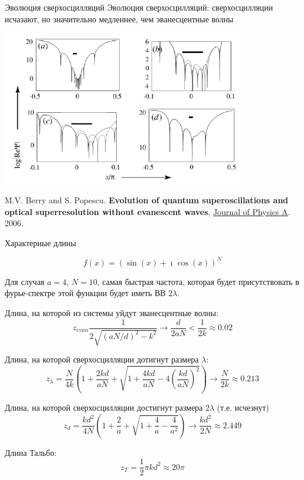 \documentclass[9pt, compress, xcolor=table]{beamer}
\begin{document}
\begin{frame}{Эволюция сверхосцилляций}
Эволюция сверхосцилляций: сверхосцилляции исчазают, но значительно медленнее, чем эванесцентные волны

\begin{center}
\includegraphics[width=0.8\textwidth]{nh7}
\end{center}

M.V. Berry and S. Popescu. \textbf{Evolution of quantum superoscillations and optical superresolution without evanescent waves}, \underline{Journal of Physics A}. 2006.
\end{frame}

\begin{frame}{Характерные длины}

\begin{equation*}
f(x)=\left(\sin(x)+\imath \cos(x)\right)^N
\end{equation*}

{\small Для случая $a=4$, $N=10$, самая быстрая частота, которая будет присутствовать в фурье-спектре этой функции будет иметь ВВ $2\lambda$.}

Длина, на которой из системы уйдут эванесцентные волны:
\begin{equation*}
z_{evan}\frac{1}{2\sqrt{(aN/d)^2-k^2}}\rightarrow\frac{d}{2aN}<\frac{1}{2k}\approx 0.02
\end{equation*}

Длина, на которой сверхосцилляции дотигнут размера $\lambda$:
\begin{equation*}
z_{\lambda}=\frac{N}{4k}\left(1+\frac{2kd}{aN}+\sqrt{1+\frac{4kd}{aN}-4\left(\frac{kd}{aN}\right)^2}\right)\rightarrow\frac{N}{2k}\approx 0.213
\end{equation*}

Длина, на которой сверхосцилляции достигнут размера $2\lambda$ (т.е. исчезнут)
\begin{equation*}
z_{d}=\frac{kd^2}{4N}\left(1+\frac{2}{a}+\sqrt{1+\frac{4}{a}-\frac{4}{a^2}}\right)\rightarrow\frac{kd^2}{2N}\approx 2.449
\end{equation*}

Длина Тальбо:
\begin{equation*}
z_{T}=\frac{1}{2}\pi k d^2\approx 20 \pi
\end{equation*}

\end{frame}
\end{document}

